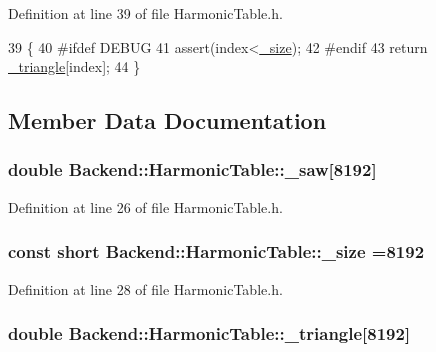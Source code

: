 Definition at line 39 of file Harmonic\+Table.\+h.


\begin{DoxyCode}
39                                                                            \{
40 \textcolor{preprocessor}{#ifdef DEBUG}
41         assert(index<\hyperlink{classBackend_1_1HarmonicTable_a94c9f17b8fd4b514d145fbb8b0ed63dd}{\_size});
42 \textcolor{preprocessor}{#endif}
43         \textcolor{keywordflow}{return} \hyperlink{classBackend_1_1HarmonicTable_a8e6fa80e2428d690a5716ae2815fd032}{\_triangle}[index];
44     \}
\end{DoxyCode}


\subsection{Member Data Documentation}
\hypertarget{classBackend_1_1HarmonicTable_a464db802494a562d2c9d0840ee6d1483}{
\subsubsection[{\+\_\+saw}]{\setlength{\rightskip}{0pt plus 5cm}double Backend\+::\+Harmonic\+Table\+::\+\_\+saw\mbox{[}8192\mbox{]}\hspace{0.3cm}{\ttfamily [protected]}}}\label{classBackend_1_1HarmonicTable_a464db802494a562d2c9d0840ee6d1483}


Definition at line 26 of file Harmonic\+Table.\+h.

\hypertarget{classBackend_1_1HarmonicTable_a94c9f17b8fd4b514d145fbb8b0ed63dd}{
\subsubsection[{\+\_\+size}]{\setlength{\rightskip}{0pt plus 5cm}const short Backend\+::\+Harmonic\+Table\+::\+\_\+size =8192\hspace{0.3cm}{\ttfamily [protected]}}}\label{classBackend_1_1HarmonicTable_a94c9f17b8fd4b514d145fbb8b0ed63dd}


Definition at line 28 of file Harmonic\+Table.\+h.

\hypertarget{classBackend_1_1HarmonicTable_a8e6fa80e2428d690a5716ae2815fd032}{
\subsubsection[{\+\_\+triangle}]{\setlength{\rightskip}{0pt plus 5cm}double Backend\+::\+Harmonic\+Table\+::\+\_\+triangle\mbox{[}8192\mbox{]}\hspace{0.3cm}{\ttfamily [protected]}}}\label{classBackend_1_1HarmonicTable_a8e6fa80e2428d690a5716ae2815fd032}



